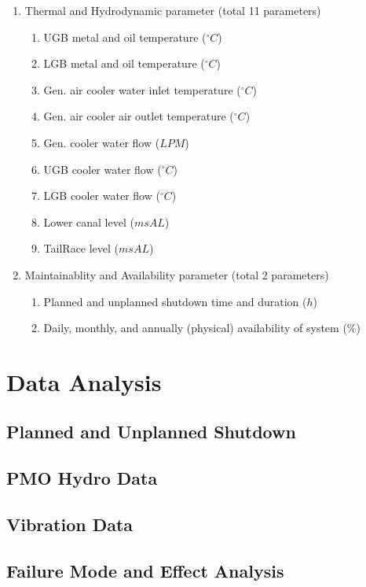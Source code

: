 \documentclass[11pt,a4paper,twoside,onecolumn]{book}
\begin{document}
\begin{enumerate}
			\item Thermal and Hydrodynamic parameter (total 11 parameters)
			\begin{enumerate}
				\item UGB metal and oil temperature (\(^{\circ} C\))
				\item LGB metal and oil temperature (\(^{\circ} C\))
				\item Gen. air cooler water inlet temperature (\(^{\circ} C\))
				\item Gen. air cooler air outlet temperature (\(^{\circ} C\))
				\item Gen. cooler water flow (\(LPM\))
				\item UGB cooler water flow (\(^{\circ} C\))
				\item LGB cooler water flow (\(^{\circ} C\))
				\item Lower canal level (\(msAL\))
				\item TailRace level (\(msAL\))
			\end{enumerate}
			
			\item Maintainablity and Availability parameter (total 2 parameters)
			\begin{enumerate}
				\item Planned and unplanned shutdown time and duration (\(h\))
				\item Daily, monthly, and annually (physical) availability of system (\(\%\))
			\end{enumerate}
		\end{enumerate}
		
	\chapter{Data Analysis}
	
		\section{Planned and Unplanned Shutdown}
		
		\section{PMO Hydro Data}
		
		\section{Vibration Data}
		
		\section{Failure Mode and Effect Analysis}
		
\end{document}
